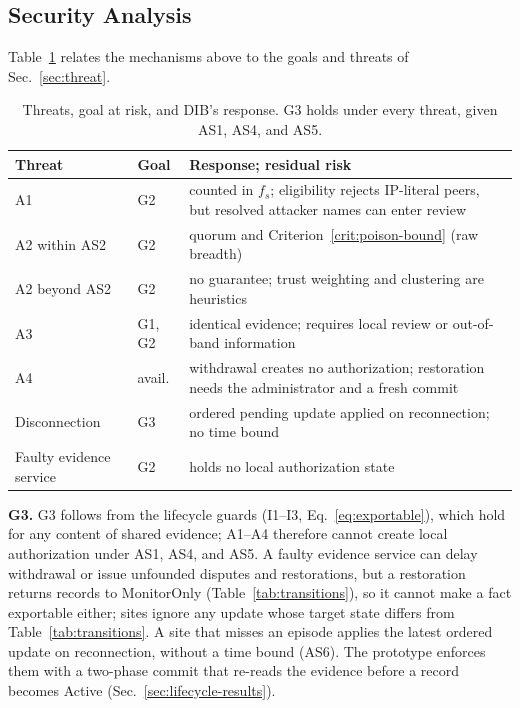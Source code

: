 \documentclass[journal]{IEEEtran}
\theoremstyle{definition}
\begin{document}
\subsection{Security Analysis}
\label{subsec:security-analysis}
Table~\ref{tab:threats} relates the mechanisms above to the goals and threats of Sec.~\ref{sec:threat}.

\begin{table}[t]
\centering
\caption{Threats, goal at risk, and DIB's response. G3 holds under every threat, given AS1, AS4, and AS5.}
\label{tab:threats}
\scriptsize
\begin{tabular}{@{}p{1.45cm}p{0.95cm}p{4.65cm}@{}}
\toprule
Threat & Goal & Response; residual risk \\
\midrule
A1 & G2 & counted in $f_s$; eligibility rejects IP-literal peers, but resolved attacker names can enter review \\
A2 within AS2 & G2 & quorum and Criterion~\ref{crit:poison-bound} (raw breadth) \\
A2 beyond AS2 & G2 & no guarantee; trust weighting and clustering are heuristics \\
A3 & G1, G2 & identical evidence; requires local review or out-of-band information \\
A4 & avail. & withdrawal creates no authorization; restoration needs the administrator and a fresh commit \\
Disconnection & G3 & ordered pending update applied on reconnection; no time bound \\
Faulty evidence service & G2 & holds no local authorization state \\
\bottomrule
\end{tabular}
\end{table}

\textbf{G3.} G3 follows from the lifecycle guards (I1--I3, Eq.~\ref{eq:exportable}), which hold for any content of shared evidence; A1--A4 therefore cannot create local authorization under AS1, AS4, and AS5. A faulty evidence service can delay withdrawal or issue unfounded disputes and restorations, but a restoration returns records to MonitorOnly (Table~\ref{tab:transitions}), so it cannot make a fact exportable either; sites ignore any update whose target state differs from Table~\ref{tab:transitions}. A site that misses an episode applies the latest ordered update on reconnection, without a time bound (AS6). The prototype enforces them with a two-phase commit that re-reads the evidence before a record becomes Active (Sec.~\ref{sec:lifecycle-results}).
\end{document}
